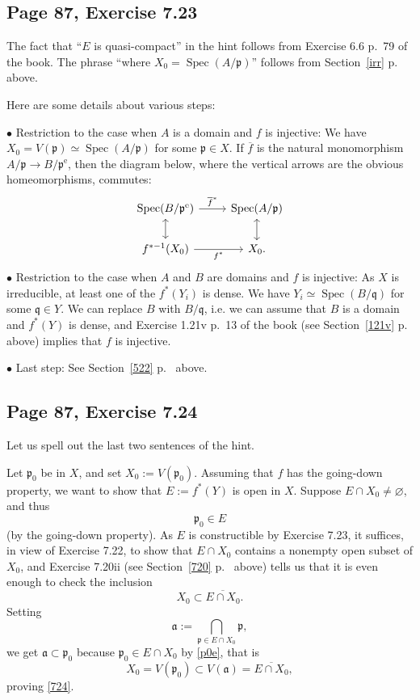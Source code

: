 \documentclass[parskip=half,fontsize=12pt]{scrartcl}%
\newcommand{\oo}{\operatorname}\newcommand{\ooo}{\operatorname*}
\newcommand{\mf}{\mathfrak}
\newcommand{\aaa}{\mf a}
\newcommand{\ppp}{\mf p}
\newcommand{\qqq}{\mf q}
\newcommand{\bu}{\bullet}
\newcommand{\Spec}{\operatorname{Spec}}\newcommand{\Sp}{\operatorname{Spec}}
\begin{document}
\subsection{Page 87, Exercise 7.23}%

The fact that ``$E$ is quasi-compact'' in the hint follows from Exercise 6.6 p.~79 of the book. The phrase ``where $X_0=\Spec(A/\ppp)$'' follows from Section~\ref{irr} p.~\pageref{irr} above. %

Here are some details about various steps:

$\bu$ Restriction to the case when $A$ is a domain and $f$ is injective: We have $X_0=V(\ppp)\simeq\Spec(A/\ppp)$ for some $\ppp\in X$. If $\overline f$ is the natural monomorphism $A/\ppp\to B/\ppp^{\oo e}$, then the diagram below, where the vertical arrows are the obvious homeomorphisms, commutes: 
$$
\begin{tikzcd}
\Spec(B/\ppp^{\oo e})\ar[r,"\overline f^*"]\ar[d,leftrightarrow]&\Spec(A/\ppp)\ar[d,leftrightarrow]\\ 
f^{*-1}(X_0)\ar[r,"f^*"']&X_0.
\end{tikzcd}
$$ 
$\bu$ Restriction to the case when $A$ and $B$ are domains and $f$ is injective: As $X$ is irreducible, at least one of the $f^*(Y_i)$ is dense. We have $Y_i\simeq\Spec(B/\qqq)$ for some $\qqq\in Y$. We can replace $B$ with $B/\qqq$, i.e. we can assume that $B$ is a domain and $f^*(Y)$ is dense, and Exercise 1.21v p.~13 of the book (see Section~\ref{121v} p.~\pageref{121v} above) implies that $f$ is injective. 

$\bu$ Last step: See Section~\ref{522} p.~\pageref{522} above.

\subsection{Page 87, Exercise 7.24}%

Let us spell out the last two sentences of the hint.

Let $\ppp_0$ be in $X$, and set $X_0:=V(\ppp_0)$. Assuming that $f$ has the going-down property, we want to show that $E:=f^*(Y)$ is open in $X$. Suppose $E\cap X_0\ne\varnothing$, and thus 
\begin{equation}\label{p0e}
\ppp_0\in E
\end{equation} 
(by the going-down property). As $E$ is constructible by Exercise 7.23, it suffices, in view of Exercise 7.22, to show that $E\cap X_0$ contains a nonempty open subset of $X_0$, and Exercise 7.20ii (see Section~\ref{720} p.~\pageref{720} above) tells us that it is even enough to check the inclusion 
\begin{equation}\label{724}
X_0\subset\overline{E\cap X_0}.
\end{equation} 
Setting 
$$
\aaa:=\bigcap_{\ppp\in E\cap X_0}\ppp,
$$ 
we get $\aaa\subset\ppp_0$ because $\ppp_0\in E\cap X_0$ by \eqref{p0e}, that is 
$$
X_0=V(\ppp_0)\subset V(\aaa)=\overline{E\cap X_0},
$$ 
proving \eqref{724}.
\end{document}
